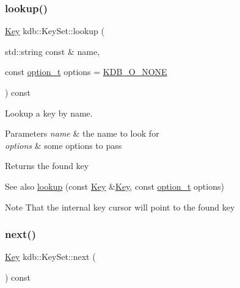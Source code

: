 \subsubsection{\texorpdfstring{lookup()}{lookup()}\hspace{0.1cm}{\footnotesize\ttfamily [2/2]}}
{\footnotesize\ttfamily \mbox{\hyperlink{classkdb_1_1Key}{Key}} kdb\+::\+Key\+Set\+::lookup (\begin{DoxyParamCaption}\item[{std\+::string const \&}]{name,  }\item[{const \mbox{\hyperlink{group__keyset_ga98a3d6a4016c9dad9cbd1a99a9c2a45a}{option\+\_\+t}}}]{options = {\ttfamily \mbox{\hyperlink{group__keyset_gga98a3d6a4016c9dad9cbd1a99a9c2a45aa00738455e0ae843c8720809d8287f370}{K\+D\+B\+\_\+\+O\+\_\+\+N\+O\+NE}}} }\end{DoxyParamCaption}) const\hspace{0.3cm}{\ttfamily [inline]}}



Lookup a key by name. 


\begin{DoxyParams}{Parameters}
{\em name} & the name to look for \\
\hline
{\em options} & some options to pass\\
\hline
\end{DoxyParams}
\begin{DoxyReturn}{Returns}
the found key 
\end{DoxyReturn}
\begin{DoxySeeAlso}{See also}
\mbox{\hyperlink{classkdb_1_1KeySet_a78125fb19c6aebb0d8fc1a7238b78ace}{lookup}} (const \mbox{\hyperlink{classkdb_1_1Key}{Key}} \&\mbox{\hyperlink{group__key}{Key}}, const \mbox{\hyperlink{group__keyset_ga98a3d6a4016c9dad9cbd1a99a9c2a45a}{option\+\_\+t}} options)
\end{DoxySeeAlso}
\begin{DoxyNote}{Note}
That the internal key cursor will point to the found key 
\end{DoxyNote}
\mbox{\label{classkdb_1_1KeySet_affd52d130faf184361297f9e7f0c9f16}} 
\subsubsection{\texorpdfstring{next()}{next()}}
{\footnotesize\ttfamily \mbox{\hyperlink{classkdb_1_1Key}{Key}} kdb\+::\+Key\+Set\+::next (\begin{DoxyParamCaption}{ }\end{DoxyParamCaption}) const\hspace{0.3cm}{\ttfamily [inline]}}



